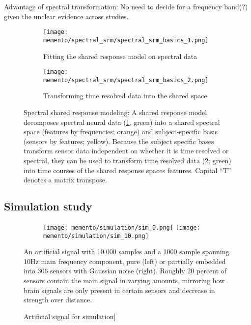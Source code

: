 Advantage of spectral transformation: No need to decide for a frequency band(?) given the unclear evidence across studies.

\begin{figure}
	\centering
	\begin{subfigure}{0.9\textwidth}
		\texttt{[image: memento/spectral\_srm/spectral\_srm\_basics\_1.png]}
		\caption{Fitting the shared response model on spectral data}
		\label{fig:spectral-srm1}
	\end{subfigure}
	\begin{subfigure}{0.9\textwidth}
		\texttt{[image: memento/spectral\_srm/spectral\_srm\_basics\_2.png]}
		\caption{Transforming time resolved data into the shared space}
		\label{fig:spectral-srm2}
	\end{subfigure}
	\caption[Spectral shared response modeling]{Spectral shared response modeling: A shared response model decomposes spectral neural data (\ref{fig:spectral-srm1}, green) into a shared spectral space (features by frequencies; orange) and subject-specific basis (sensors by features; yellow). Because the subject specific bases transform sensor data independent on whether it is time resolved or spectral, they can be used to transform time resolved data (\ref{fig:spectral-srm2}; green) into time courses of the shared response spaces features. Capital ``T'' denotes a matrix transpose.}
	\label{fig:spectral-srm}
\end{figure}

\subsection{Simulation study}


\begin{figure}
	\begin{subfigure}{1.0\textwidth}
		 \centering
		\texttt{[image: memento/simulation/sim\_0.png]}
		\texttt{[image: memento/simulation/sim\_10.png]}
	\end{subfigure}
	\caption{Artificial signal for simulation]}{An artificial signal with 10.000 samples and a 1000 sample spanning 10Hz main frequency component, pure (left) or partially embedded into 306 sensors with Gaussian noise (right). Roughly 20 percent of sensors contain the main signal in varying amounts, mirroring how brain signals are only present in certain sensors and decrease in strength over distance.}
	\label{fig:sim_artificial_signal}
\end{figure}

